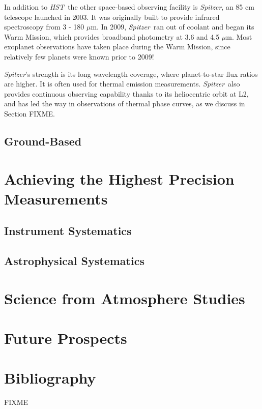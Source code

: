 \documentclass[graybox,natbib,nosecnum]{svmult}
\newcommand{\project}[1]{\textsl{#1}}
\newcommand{\HST}{\project{HST}}
\newcommand{\Spitzer}{\project{Spitzer}}
\begin{document}
In addition to \HST\, the other space-based observing facility is \Spitzer, an 85 cm telescope launched in 2003. It was originally built to provide infrared spectroscopy from 3 - 180 $\mu$m.  In 2009, \Spitzer\ ran out of coolant and began its Warm Mission, which provides broadband photometry at 3.6 and 4.5 $\mu$m.  Most exoplanet observations have taken place during the Warm Mission, since relatively few planets were known prior to 2009!

\Spitzer's strength is its long wavelength coverage, where planet-to-star flux ratios are higher. It is often used for thermal emission measurements. \Spitzer\ also provides continuous observing capability thanks to its heliocentric orbit at L2, and has led the way in observations of thermal phase curves, as we discuss in Section FIXME.

\subsection{Ground-Based}

\section{Achieving the Highest Precision Measurements}
\subsection{Instrument Systematics}
\subsection{Astrophysical Systematics}

\section{Science from Atmosphere Studies}

\section{Future Prospects}

\section{Bibliography}

\begin{acknowledgement}
FIXME
\end{acknowledgement}

\end{document}
